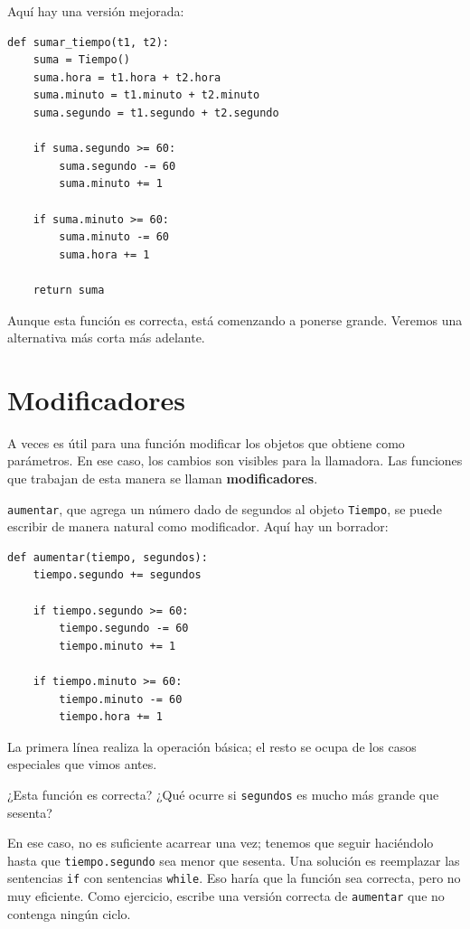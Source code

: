 \documentclass[10pt]{book}
\begin{document}
Aquí hay una versión mejorada:

\begin{verbatim}
def sumar_tiempo(t1, t2):
    suma = Tiempo()
    suma.hora = t1.hora + t2.hora
    suma.minuto = t1.minuto + t2.minuto
    suma.segundo = t1.segundo + t2.segundo

    if suma.segundo >= 60:
        suma.segundo -= 60
        suma.minuto += 1

    if suma.minuto >= 60:
        suma.minuto -= 60
        suma.hora += 1

    return suma
\end{verbatim}
%
Aunque esta función es correcta, está comenzando a ponerse grande.
Veremos una alternativa más corta más adelante.


\section{Modificadores}
\label{increment}

A veces es útil para una función modificar los objetos que obtiene como
parámetros.  En ese caso, los cambios son visibles para la llamadora.
Las funciones que trabajan de esta manera se llaman {\bf modificadores}.

{\tt aumentar}, que agrega un número dado de segundos al objeto {\tt Tiempo},
se puede escribir de manera natural como
modificador.  Aquí hay un borrador:

\begin{verbatim}
def aumentar(tiempo, segundos):
    tiempo.segundo += segundos

    if tiempo.segundo >= 60:
        tiempo.segundo -= 60
        tiempo.minuto += 1

    if tiempo.minuto >= 60:
        tiempo.minuto -= 60
        tiempo.hora += 1
\end{verbatim}
%
La primera línea realiza la operación básica; el resto se ocupa
de los casos especiales que vimos antes.

¿Esta función es correcta?  ¿Qué ocurre si {\tt segundos}
es mucho más grande que sesenta?

En ese caso, no es suficiente acarrear una vez; tenemos que seguir haciéndolo
hasta que {\tt tiempo.segundo} sea menor que sesenta.  Una solución es
reemplazar las sentencias {\tt if} con sentencias {\tt while}.  Eso
haría que la función sea correcta, pero no muy eficiente.  Como
ejercicio, escribe una versión correcta de {\tt aumentar} que no
contenga ningún ciclo.
\end{document}
